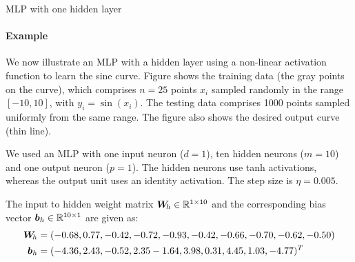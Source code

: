 \begin{frame}{MLP with one hidden layer}
\framesubtitle{Example}
    We now illustrate an MLP with a hidden layer using a
    non-linear activation function to learn the sine curve.
Figure shows the training data (the gray points
    on the curve), which comprises $n=25$ points $x_i$ sampled randomly
    in the range $[-10,10]$, with $y_i = \sin(x_i)$. 
    The testing data comprises 1000 points sampled uniformly from 
    the same range.
    The figure also shows the desired output curve (thin line).
 

\medskip 
   We used an MLP with
    one input neuron ($d=1$),
    ten hidden neurons ($m=10$) and one output neuron ($p=1$). The hidden
    neurons use tanh activations, whereas the output unit
    uses an identity activation. The step size is $\eta=0.005$. 


\medskip 

    The input to hidden weight matrix ${\boldsymbol W}_{\!h} \in {\mathord{\mathbb R}}^{1\times 10}$ and the
    corresponding bias vector ${\boldsymbol b}_{h} \in {\mathord{\mathbb R}}^{10 \times 1}$ 
    are given as:
    \begin{align*}        
        {\boldsymbol W}_{\!h} & = (-0.68,  0.77, -0.42, -0.72, -0.93, -0.42,
        -0.66, -0.70, -0.62, -0.50)\\
        {\boldsymbol b}_{h} & = (-4.36,  2.43, -0.52,  2.35  -1.64,  3.98,
        0.31,  4.45,  1.03, -4.77)^T
    \end{align*}
\end{frame}


